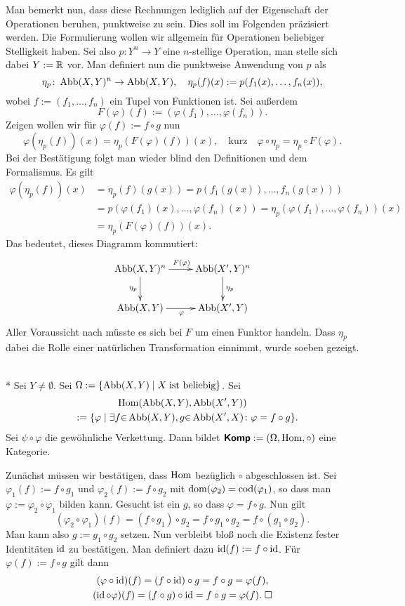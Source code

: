 Man bemerkt nun, dass diese Rechnungen lediglich auf der Eigenschaft
der Operationen beruhen, punktweise zu sein. Dies soll im Folgenden
präzisiert werden. Die Formulierung wollen wir allgemein für
Operationen beliebiger Stelligkeit haben. Sei also $p\colon Y^n\to Y$
eine $n$-stellige Operation, man stelle sich dabei $Y:=\mathbb R$ vor. Man
definiert nun die punktweise Anwendung von $p$ als%
\[\eta_p\colon\operatorname{Abb}(X,Y)^n\to\operatorname{Abb}(X,Y),\quad
\eta_p(f)(x) := p(f_1(x),\ldots,f_n(x)),\]
wobei $f:=(f_1,\ldots,f_n)$ ein Tupel von Funktionen ist. Sei außerdem%
\[F(\varphi)(f) := (\varphi(f_1),\ldots,\varphi(f_n)).\]
Zeigen wollen wir für $\varphi(f):=f\circ g$ nun
\[\varphi(\eta_p(f))(x) = \eta_p(F(\varphi)(f))(x),
\quad\text{kurz}\quad
\varphi\circ\eta_p = \eta_p\circ F(\varphi).\]
Bei der Bestätigung folgt man wieder blind den Definitionen und dem
Formalismus. Es gilt%
\begin{align*}
\varphi(\eta_p(f))(x)
&= \eta_p(f)(g(x)) = p(f_1(g(x)),\ldots,f_n(g(x)))\\
&= p(\varphi(f_1)(x),\ldots,\varphi(f_n)(x))
= \eta_p(\varphi(f_1),\ldots,\varphi(f_n))(x)\\
&= \label{eq:Ende-eta-punktweise}\eta_p(F(\varphi)(f))(x).
\end{align*}
Das bedeutet, dieses Diagramm kommutiert:
\[\xymatrix{
\Abb(X,Y)^n \ar[r]^{F(\varphi)} \ar[d]_{\eta_p}
& \Abb(X',Y)^n \ar[d]^{\eta_p} \\
\Abb(X,Y) \ar[r]_{\varphi} & \Abb(X',Y)}\]
Aller Voraussicht nach müsste es sich bei $F$ um einen Funktor
handeln. Dass $\eta_p$ dabei die Rolle einer natürlichen Transformation
einnimmt, wurde soeben gezeigt.

\begin{Satz}\mbox{}\\*
Sei $Y\ne\emptyset$. Sei $\Omega:=\{\operatorname{Abb}(X,Y)\mid X\;\text{ist beliebig}\}$.
Sei%
\begin{gather*}\operatorname{Hom}(\operatorname{Abb}(X,Y),\operatorname{Abb}(X',Y))\\
\quad := \{\varphi\mid\exists f{\in}\operatorname{Abb}(X,Y), g{\in}\operatorname{Abb}(X',X)\colon
\varphi = f\circ g\}.
\end{gather*}
Sei $\psi\circ \varphi$ die gewöhnliche Verkettung. Dann bildet
$\textsf{\textbf{Komp}}:=(\Omega,\operatorname{Hom},\circ)$ eine Kategorie.
\end{Satz}
Zunächst müssen wir bestätigen, dass $\operatorname{Hom}$ bezüglich
$\circ$ abgeschlossen ist. Sei $\varphi_1(f):=f\circ g_1$ und
$\varphi_2(f):=f\circ g_2$ mit $\operatorname{dom}(\varphi_2)=\operatorname{cod}(\varphi_1)$, so
dass man $\varphi:=\varphi_2\circ\varphi_1$ bilden kann.
Gesucht ist ein $g$, so dass $\varphi = f\circ g$. Nun gilt%
\[(\varphi_2\circ\varphi_1)(f) = (f\circ g_1)\circ g_2
= f\circ g_1\circ g_2 = f\circ (g_1\circ g_2).\]
Man kann also $g:=g_1\circ g_2$ setzen. Nun verbleibt bloß noch die
Existenz fester Identitäten $\operatorname{id}$ zu bestätigen. Man definiert dazu
$\operatorname{id}(f):=f\circ\operatorname{id}$. Für $\varphi(f):=f\circ g$ gilt dann%
\begin{gather*}
(\varphi\circ\operatorname{id})(f) = (f\circ \operatorname{id})\circ g = f\circ g = \varphi(f),\\
(\operatorname{id}\circ\varphi)(f) = (f\circ g)\circ\operatorname{id} = f\circ g = \varphi(f).\;\Box
\end{gather*}

